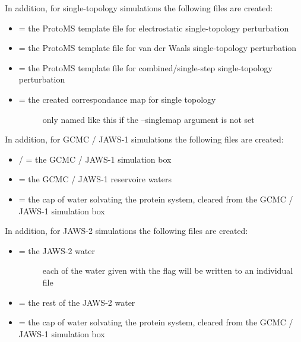 \documentclass[letterpaper,10pt,english]{manual}
\begin{document}
In addition, for single-topology simulations the following files are created:
\begin{itemize}
\item {} 
 = the ProtoMS template file for electrostatic single-topology perturbation

\item {} 
 = the ProtoMS template file for van der Waals single-topology perturbation

\item {} 
 = the ProtoMS template file for combined/single-step single-topology perturbation

\item {} \begin{description}
\item[{ = the created correspondance map for single topology}] \leavevmode
only named like this if the --singlemap argument is not set

\end{description}

\end{itemize}

In addition, for GCMC / JAWS-1 simulations the following files are created:
\begin{itemize}
\item {} 
 /  = the GCMC / JAWS-1 simulation box

\item {} 
 = the GCMC / JAWS-1 reservoire waters

\item {} 
 = the cap of water solvating the protein system, cleared from the GCMC / JAWS-1 simulation box

\end{itemize}

In addition, for JAWS-2 simulations the following files are created:
\begin{itemize}
\item {} \begin{description}
\item[{ = the JAWS-2 water}] \leavevmode
each of the water given with the  flag will be written to an individual file

\end{description}

\item {} 
 = the rest of the JAWS-2 water

\item {} 
 = the cap of water solvating the protein system, cleared from the GCMC / JAWS-1 simulation box

\end{itemize}
\end{document}
